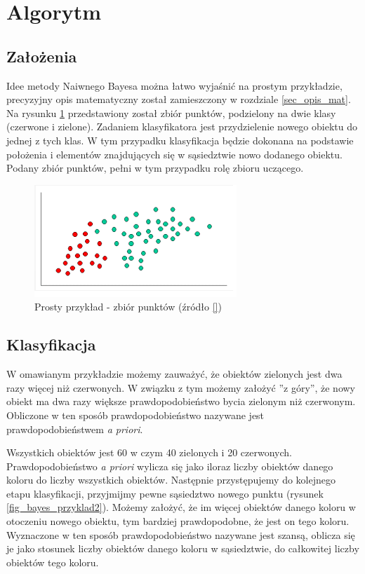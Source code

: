 \section{Algorytm}
\label{sec_algorytm}

\subsection{Założenia}
\label{subsec_zalozenia}

Idee metody Naiwnego Bayesa można łatwo wyjaśnić na prostym przykładzie, precyzyjny opis matematyczny został zamieszczony w rozdziale \ref{sec_opis_mat}. Na rysunku \ref{fig_bayes_przyklad} przedstawiony został zbiór punktów, podzielony na dwie klasy (czerwone i zielone). Zadaniem klasyfikatora jest przydzielenie nowego obiektu do jednej z tych klas. W tym przypadku klasyfikacja będzie dokonana na podstawie położenia i elementów znajdujących się w sąsiedztwie nowo dodanego obiektu. Podany zbiór punktów, pełni w tym przypadku rolę zbioru uczącego.

\begin{figure}[!htb]
  \begin{center}
    \includegraphics[scale = 1]
    {img/bayes_przyklad.png}
  \end{center}
  \caption{Prosty przykład - zbiór punktów (źródło \ref{})}
  \label{fig_bayes_przyklad}
\end{figure}

\subsection{Klasyfikacja}
\label{subsec_klasyfikacja}

W omawianym przykładzie możemy zauważyć, że obiektów zielonych jest dwa razy więcej niż czerwonych. W związku z tym możemy założyć ''z góry'', że nowy obiekt ma dwa razy większe prawdopodobieństwo bycia zielonym niż czerwonym. Obliczone w ten sposób prawdopodobieństwo nazywane jest prawdopodobieństwem \textit{a priori}. 

Wszystkich obiektów jest 60 w czym 40 zielonych i 20 czerwonych. Prawdopodobieństwo \textit{a priori} wylicza się jako iloraz liczby obiektów danego koloru do liczby wszystkich obiektów. Następnie przystępujemy do kolejnego etapu klasyfikacji, przyjmijmy pewne sąsiedztwo nowego punktu (rysunek \ref{fig_bayes_przyklad2}). Możemy założyć, że im więcej obiektów danego koloru w otoczeniu nowego obiektu, tym bardziej prawdopodobne, że jest on tego koloru. Wyznaczone w ten sposób prawdopodobieństwo nazywane jest szansą, oblicza się je jako stosunek liczby obiektów danego koloru w sąsiedztwie, do całkowitej liczby obiektów tego koloru.

